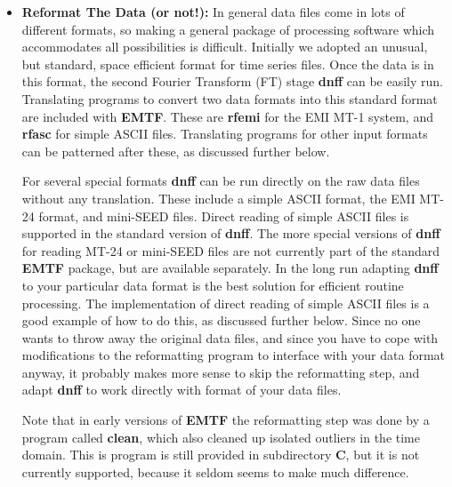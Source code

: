\begin{itemize}
\item  {\bf Reformat The Data (or not!):}   In general data files come in
lots of different formats, so making a general package
of processing software which accommodates all possibilities is
difficult.  Initially we adopted an unusual, but standard,
space efficient format for time series files.  Once the data
is in this format, the second Fourier Transform (FT) stage {\bf dnff} can be
easily run.  Translating programs to convert two data formats
into this standard format
are included with {\bf EMTF}.  These are {\bf rfemi} for the EMI MT-1 system,
and {\bf rfasc} for simple ASCII files.  Translating programs for other
input formats can be patterned after these, as discussed further below.

For several special formats {\bf dnff} can be run directly on the raw
data files without any translation.  These include a simple
ASCII format, the EMI MT-24 format, and mini-SEED files.  
Direct reading of simple ASCII files is supported in the standard
version of {\bf dnff}.
The more special versions of {\bf dnff} for reading MT-24
or mini-SEED files are not currently
part of the standard {\bf EMTF} package, but are available
separately.  In the long run adapting {\bf dnff} to your particular
data format is the best solution for efficient routine processing.
The implementation of direct reading of simple ASCII files is a 
good example of how to do this, as discussed further below.
Since no one wants to throw away the original data files, and
since you have to cope with modifications to the reformatting program
to interface with your data format anyway, it probably makes more
sense to skip the reformatting step, and adapt {\bf dnff} to
work directly with format of your data files.

Note that in early versions of {\bf EMTF} the reformatting step was
done by a program called {\bf clean},
which also cleaned up isolated outliers in the time domain.
This is program is still provided in subdirectory {\bf C},
but it is not currently supported, because it seldom seems to
make much difference. 


\end{itemize}
